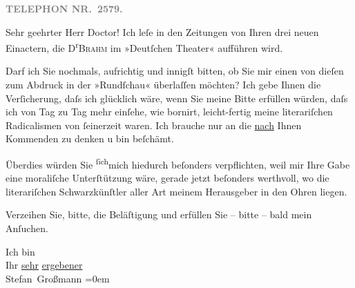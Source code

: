 \pstart
           \textcolor{gray}{\textbf{TELEPHON NR. 2579.}}\pend
           
\pstart\center{}Sehr geehrter Herr Doctor!\pend\vspace{0.5em}
\pstart
           Ich leſe in den Zeitungen von \introOben{}Ihren\introOben{} drei neuen Einactern, die D\textsuperscript{r}\textsc{Brahm} im »Deutſchen Theater« aufführen wird.\pend
           
\pstart
           Darf ich Sie nochmals, aufrichtig und innigſt bitten, ob Sie mir einen von dieſen zum
               Abdruck in der »Rundſchau« überlaſſen möchten?
               Ich gebe Ihnen die Verſicherung, daſs ich glücklich wäre, wenn Sie meine Bitte
               erfüllen würden, daſs ich von Tag zu Tag \strikeout{\textcolor{gray}{×}\-\textcolor{gray}{×}} mehr einſehe, wie bornirt, leicht-fertig meine  literariſchen Radicalismen von ſeinerzeit waren. Ich brauche nur an
               die \uline{nach} Ihnen Kommenden zu denken u bin
               beſchämt.\pend
           
\pstart
           Überdies würden Sie \substVorne{}\textsuperscript{ſich}\substDazwischen{}mich\substHinten{} hiedurch beſonders verpflichten, weil mir Ihre Gabe eine moraliſche Unter{\pb}ſtützung wäre, gerade jetzt beſonders
               werthvoll, wo die literariſchen Schwarzkünſtler aller Art meinem Herausgeber in den Ohren
               liegen.\pend
           
\pstart
           Verzeihen Sie, bitte, die Beläſtigung und erfüllen Sie – bitte – bald mein
               Anſuchen.\pend
           
\pstart
           Ich bin{\\[\baselineskip]} Ihr \uline{sehr}{ }\uline{ergebener}{\\[\baselineskip]}\spacefill\mbox{Stefan Großmann}\pend
           \leftskip=0em{}\endnumbering{}  
      